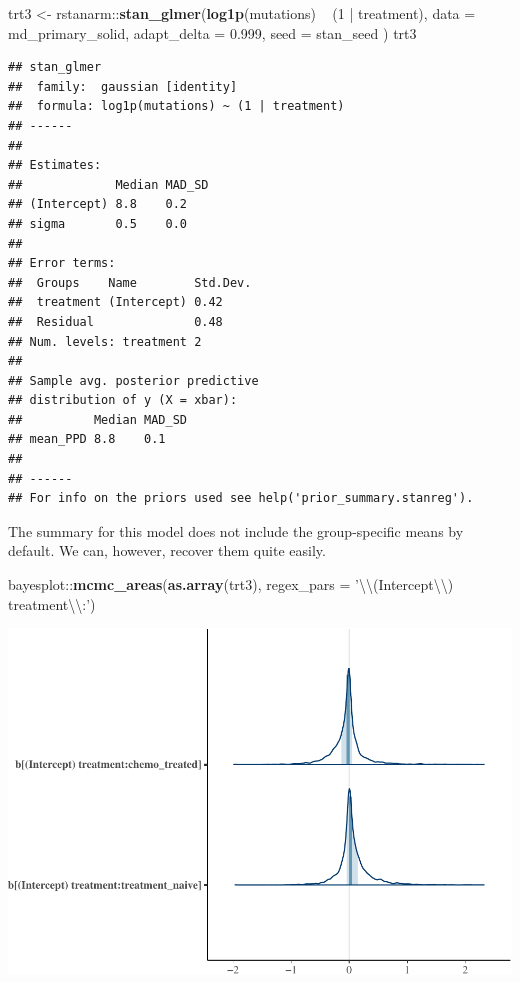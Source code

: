 \documentclass[]{article}
\newenvironment{Shaded}{\begin{snugshade}}{\end{snugshade}}
\newcommand{\KeywordTok}[1]{\textcolor[rgb]{0.13,0.29,0.53}{\textbf{{#1}}}}
\newcommand{\DataTypeTok}[1]{\textcolor[rgb]{0.13,0.29,0.53}{{#1}}}
\newcommand{\DecValTok}[1]{\textcolor[rgb]{0.00,0.00,0.81}{{#1}}}
\newcommand{\FloatTok}[1]{\textcolor[rgb]{0.00,0.00,0.81}{{#1}}}
\newcommand{\CharTok}[1]{\textcolor[rgb]{0.31,0.60,0.02}{{#1}}}
\newcommand{\StringTok}[1]{\textcolor[rgb]{0.31,0.60,0.02}{{#1}}}
\newcommand{\NormalTok}[1]{{#1}}
\begin{document}
\begin{Shaded}
\begin{Highlighting}[]
\NormalTok{trt3 <-}\StringTok{ }\NormalTok{rstanarm::}\KeywordTok{stan_glmer}\NormalTok{(}\KeywordTok{log1p}\NormalTok{(mutations) ~}\StringTok{ }\NormalTok{(}\DecValTok{1} \NormalTok{|}\StringTok{ }\NormalTok{treatment),}
                           \DataTypeTok{data =} \NormalTok{md_primary_solid,}
                           \DataTypeTok{adapt_delta =} \FloatTok{0.999}\NormalTok{,}
                           \DataTypeTok{seed =} \NormalTok{stan_seed}
                           \NormalTok{)}
\NormalTok{trt3}
\end{Highlighting}
\end{Shaded}

\begin{verbatim}
## stan_glmer
##  family:  gaussian [identity]
##  formula: log1p(mutations) ~ (1 | treatment)
## ------
## 
## Estimates:
##             Median MAD_SD
## (Intercept) 8.8    0.2   
## sigma       0.5    0.0   
## 
## Error terms:
##  Groups    Name        Std.Dev.
##  treatment (Intercept) 0.42    
##  Residual              0.48    
## Num. levels: treatment 2 
## 
## Sample avg. posterior predictive 
## distribution of y (X = xbar):
##          Median MAD_SD
## mean_PPD 8.8    0.1   
## 
## ------
## For info on the priors used see help('prior_summary.stanreg').
\end{verbatim}

The summary for this model does not include the group-specific means by
default. We can, however, recover them quite easily.

\begin{Shaded}
\begin{Highlighting}[]
\NormalTok{bayesplot::}\KeywordTok{mcmc_areas}\NormalTok{(}\KeywordTok{as.array}\NormalTok{(trt3), }\DataTypeTok{regex_pars =} \StringTok{'}\CharTok{\textbackslash{}\textbackslash{}}\StringTok{(Intercept}\CharTok{\textbackslash{}\textbackslash{}}\StringTok{) treatment}\CharTok{\textbackslash{}\textbackslash{}}\StringTok{:'}\NormalTok{)}
\end{Highlighting}
\end{Shaded}

\includegraphics{Hierarchical_model_mutations_and_peptides_files/figure-latex/psolid-trt3-coef-plot-1.pdf}
\end{document}
